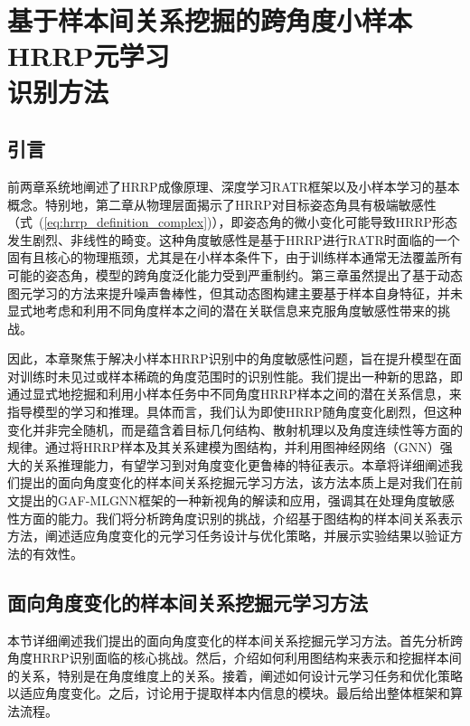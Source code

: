 \chapter{基于样本间关系挖掘的跨角度小样本HRRP元学习\\识别方法}
\label{chap:angle_robust}

\section{引言}
\label{sec:angle_intro}

前两章系统地阐述了HRRP成像原理、深度学习RATR框架以及小样本学习的基本概念。特别地，第二章从物理层面揭示了HRRP对目标姿态角具有极端敏感性（式~(\ref{eq:hrrp_definition_complex})），即姿态角的微小变化可能导致HRRP形态发生剧烈、非线性的畸变。这种角度敏感性是基于HRRP进行RATR时面临的一个固有且核心的物理瓶颈，尤其是在小样本条件下，由于训练样本通常无法覆盖所有可能的姿态角，模型的跨角度泛化能力受到严重制约。第三章虽然提出了基于动态图元学习的方法来提升噪声鲁棒性，但其动态图构建主要基于样本自身特征，并未显式地考虑和利用不同角度样本之间的潜在关联信息来克服角度敏感性带来的挑战。

因此，本章聚焦于解决小样本HRRP识别中的角度敏感性问题，旨在提升模型在面对训练时未见过或样本稀疏的角度范围时的识别性能。我们提出一种新的思路，即通过显式地挖掘和利用小样本任务中不同角度HRRP样本之间的潜在关系信息，来指导模型的学习和推理。具体而言，我们认为即使HRRP随角度变化剧烈，但这种变化并非完全随机，而是蕴含着目标几何结构、散射机理以及角度连续性等方面的规律。通过将HRRP样本及其关系建模为图结构，并利用图神经网络（GNN）强大的关系推理能力，有望学习到对角度变化更鲁棒的特征表示。本章将详细阐述我们提出的面向角度变化的样本间关系挖掘元学习方法，该方法本质上是对我们在前文提出的GAF-MLGNN框架的一种新视角的解读和应用，强调其在处理角度敏感性方面的能力。我们将分析跨角度识别的挑战，介绍基于图结构的样本间关系表示方法，阐述适应角度变化的元学习任务设计与优化策略，并展示实验结果以验证方法的有效性。

\section{面向角度变化的样本间关系挖掘元学习方法}
\label{sec:angle_method}

本节详细阐述我们提出的面向角度变化的样本间关系挖掘元学习方法。首先分析跨角度HRRP识别面临的核心挑战。然后，介绍如何利用图结构来表示和挖掘样本间的关系，特别是在角度维度上的关系。接着，阐述如何设计元学习任务和优化策略以适应角度变化。之后，讨论用于提取样本内信息的模块。最后给出整体框架和算法流程。

